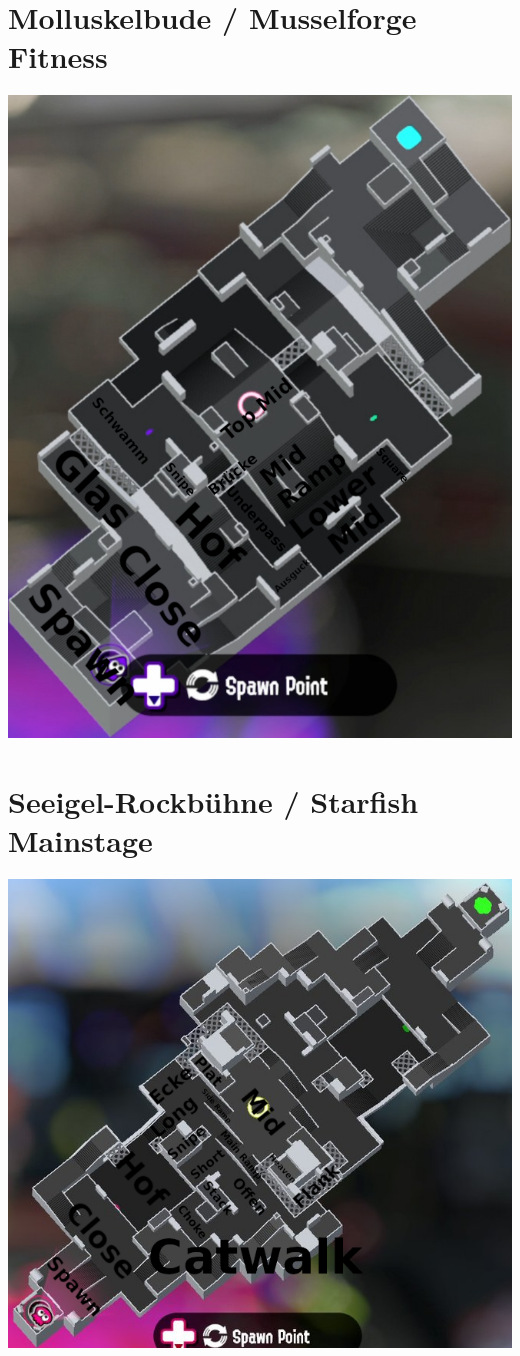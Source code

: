 \documentclass{scrreprt}
\begin{document}
\section{Molluskelbude / Musselforge Fitness}
\includegraphics[width=\linewidth]{img/musselforgefitness.png}
\section{Seeigel-Rockbühne / Starfish Mainstage}
\includegraphics[width=\linewidth]{img/starfishmainstage.png}
\end{document}
